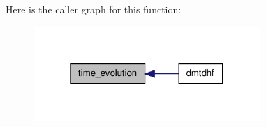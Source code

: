 Here is the caller graph for this function:
\nopagebreak
\begin{figure}[H]
\begin{center}
\leavevmode
\includegraphics[width=244pt]{time__evol_8f90_a10534c39878a0b190f230860a356df23_icgraph}
\end{center}
\end{figure}


